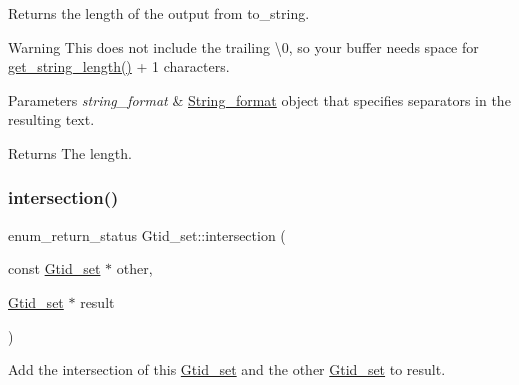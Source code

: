 Returns the length of the output from to\+\_\+string.

\begin{DoxyWarning}{Warning}
This does not include the trailing \textquotesingle{}\textbackslash{}0\textquotesingle{}, so your buffer needs space for \mbox{\hyperlink{classGtid__set_a9183195ad785890b208ce15ce111755b}{get\+\_\+string\+\_\+length()}} + 1 characters.
\end{DoxyWarning}

\begin{DoxyParams}{Parameters}
{\em string\+\_\+format} & \mbox{\hyperlink{structGtid__set_1_1String__format}{String\+\_\+format}} object that specifies separators in the resulting text. \\
\hline
\end{DoxyParams}
\begin{DoxyReturn}{Returns}
The length. 
\end{DoxyReturn}
\mbox{\label{classGtid__set_a9a384be7c735d018d5fc0c8c0c64344e}} 
\subsubsection{\texorpdfstring{intersection()}{intersection()}}
{\footnotesize\ttfamily enum\+\_\+return\+\_\+status Gtid\+\_\+set\+::intersection (\begin{DoxyParamCaption}\item[{const \mbox{\hyperlink{classGtid__set}{Gtid\+\_\+set}} $\ast$}]{other,  }\item[{\mbox{\hyperlink{classGtid__set}{Gtid\+\_\+set}} $\ast$}]{result }\end{DoxyParamCaption})}

Add the intersection of this \mbox{\hyperlink{classGtid__set}{Gtid\+\_\+set}} and the other \mbox{\hyperlink{classGtid__set}{Gtid\+\_\+set}} to result.


